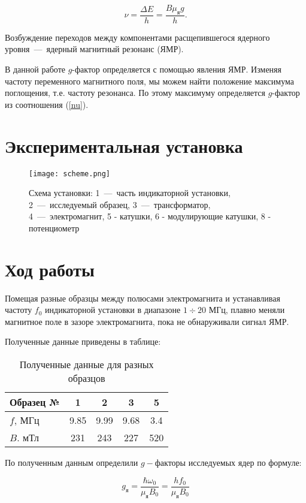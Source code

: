 \documentclass{physlab}
\begin{document}
\begin{equation} \label{nu}
\nu = \frac{\Delta E}{h} = \frac{B \mu_\text{я} g}{h}.
\end{equation}

Возбуждение переходов между компонентами расщепившегося ядерного уровня~---~ядерный магнитный резонанс (ЯМР). 

В данной работе $g$-фактор определяется с помощью явления ЯМР. Изменяя частоту переменного магнитного поля, мы можем найти положение максимума поглощения, т.е. частоту резонанса. По этому максимуму определяется $g$-фактор из соотношения (\ref{nu}).
	
\section{Экспериментальная установка}
	
\begin{figure}[H]
 \centering
 {\texttt{[image: scheme.png]}}
\caption{Схема установки: 1~---~часть индикаторной установки, 2~---~исследуемый образец, 3~---~трансформатор, 4~---~электромагнит, 5 - катушки, 6 - модулирующие катушки, 8 - потенциометр }
\end{figure}

\section{Ход работы}
	
Помещая разные образцы между полюсами электромагнита и устанавливая частоту $f_0$ индикаторной установки в диапазоне $1\div20$ МГц, плавно меняли магнитное поле в зазоре электромагнита, пока не обнаруживали сигнал ЯМР.

Полученные данные приведены в таблице:

\begin{table} [h]
	\centering
	\caption{Полученные данные для разных образцов}
	\begin{tabular}{|l||c|c|c|c|}
		\hline
		Образец № & 1 & 2 & 3 & 5 \\
		\hline
		$f$, МГц & 9.85 & 9.99 & 9.68 & 3.4 \\
		\hline
		$B$. мТл & 231 & 243 & 227 & 520 \\
		\hline
	\end{tabular}
\end{table}

По полученным данным определили $g-$факторы исследуемых ядер по формуле:

\begin{equation}
g_\text{я} = \frac{\hbar \omega_0}{\mu_\text{я} B_0} = \frac{h f_0}{\mu_\text{я} B_0}
\end{equation}
\end{document}
